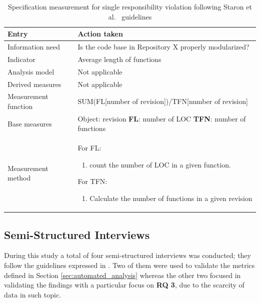     \begin{table}[!htb]
		\centering
		\tabulinesep=1.2mm
        \begin{tabu} to \textwidth {|X|X[2]|}

			\hline
			\textbf{Entry} & \textbf{Action taken} \\
			\hline

			Information need & Is the code base in Repository X properly modularized? \\
			\hline

			Indicator & Average length of functions \\
			\hline

			Analysis model & Not applicable \\
			\hline

			Derived measures & Not applicable \\
			\hline

			Measurement function & SUM(FL[number of revision])/TFN[number of revision] \\
			\hline

			Base measures & Object: revision \newline
			                    \textbf{FL}: number of LOC \newline
			                    \textbf{TFN}: number of functions \\
		    \hline

			Measurement method & For FL:
			    \begin{enumerate}
			    \item count the number of LOC in a given function.
			    \end{enumerate}

			For TFN:
			\begin{enumerate}
			\item Calculate the number of functions in a given revision
			\end{enumerate}

			\\
			\hline


		\end{tabu}
		\caption[Specification measurement for single responsibility violation]
        {Specification measurement for single responsibility violation following Staron et al.\ \cite{metrics_paper} guidelines}
        \label{tab:length_measurement_system}
    \end{table}

\FloatBarrier

\subsection{Semi-Structured Interviews} \label{sec:semi-structured_interviews}
During this study a total of four semi-structured interviews was conducted; they follow the guidelines expressed in \cite{interview_guideline}. Two of them were used to validate the metrics defined in Section \ref{sec:automated_analysis} whereas the other two focused in validating the findings with a particular focus on \textbf{RQ 3}, due to the scarcity of data in such topic.

